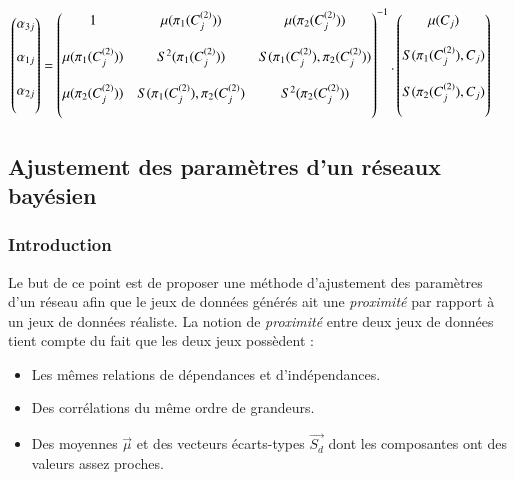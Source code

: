 \documentclass[a4paper]{article}
\begin{document}
$\\ \\ \\ \begin{pmatrix}
\alpha_{3j}\\ \\
\alpha_{1j}\\ \\
\alpha_{2j}\\ \\
\end{pmatrix}
=\begin{pmatrix}
1&\mu(\pi_{1}(C_{j}^{(2)}))&\mu(\pi_{2}(C_{j}^{(2)}))\\ \\

\mu(\pi_{1}(C_{j}^{(2)}))&S^{2}(\pi_{1}(C_{j}^{(2)}))&S(\pi_{1}(C_{j}^{(2)}),  \pi_{2}(C_{j}^{(2)}))\\ \\

\mu(\pi_{2}(C_{j}^{(2)}))&S(\pi_{1}(C_{j}^{(2)}),  \pi_{2}(C_{j}^{(2)})&S^{2}(\pi_{2}(C_{j}^{(2)}))\\ \\
\end{pmatrix}^{-1}
.\begin{pmatrix}
\mu(C_{j})\\ \\
S(\pi_{1}(C_{j}^{(2)}),C_{j})\\ \\
S(\pi_{2}(C_{j}^{(2)}),C_{j})\\ \\

\end{pmatrix}$



\newpage
\subsection{Ajustement des paramètres d'un réseaux bayésien}
\subsubsection{Introduction}
Le but de ce point est de proposer une méthode d'ajustement des  paramètres d'un réseau afin que le jeux de données  générés ait une \textit{proximité} par rapport à un jeux de données réaliste. La notion de \textit{proximité} entre deux jeux de données tient compte du fait que les deux jeux possèdent : 
\begin{itemize}
\item Les mêmes relations de dépendances et d'indépendances.
\item Des corrélations du même ordre de grandeurs.
\item Des moyennes $\vec{\mu}$ et des vecteurs écarts-types $\vec{S_{d}}$ dont les composantes ont des valeurs assez proches.

\end{itemize}
 
\end{document}
